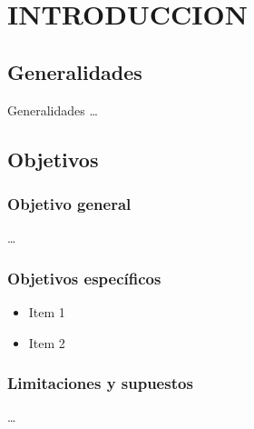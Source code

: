 \chapter{INTRODUCCION}

\section{Generalidades}

Generalidades \ldots

\section{Objetivos}

\subsection{Objetivo general}

\ldots

\subsection{Objetivos específicos}

\begin{itemize}
  \item Item 1
  \item Item 2
\end{itemize}

\subsection{Limitaciones y supuestos}

\ldots